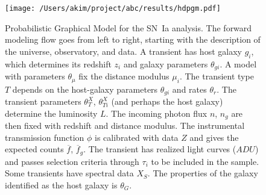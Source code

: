 \documentclass[preprint,3p]{elsarticle}
\begin{document}
\begin{figure}[htbp] %
   \centering
   \texttt{[image: /Users/akim/project/abc/results/hdpgm.pdf]} 
   \caption{Probabilistic Graphical Model for the SN~Ia analysis.  
   The forward modeling
   flow goes from left to right, starting with the description of the universe, observatory,
   and data.    A transient has host galaxy $g_i$, which determines its redshift $z_i$
   and galaxy parameters $\theta_{gi}$.
   A model with parameters $\theta_\mu$ fix the distance modulus $\mu_i$.
   The transient type $T$ depends on the host-galaxy parameters  $\theta_{gi}$
   and rates $\theta_r$.   The transient
   parameters $\theta_T^X$, $\theta_{Ti}^X$ (and perhaps the host galaxy) determine the luminosity $L$.       The 
   incoming photon flux $n$, $n_g$  are then fixed
   with redshift and distance modulus.
   The instrumental transmission function $\phi$ is calibrated with data ${Z}$ and
   gives the expected
   counts $\overline{f}$, $\overline{f}_g$. 
   The transient has realized light curves (${ADU}$) and passes selection criteria
   through $\tau_i$ to be included in the sample.  Some transients have spectral data
   ${X}_S$.  The properties of the galaxy identified as the host galaxy is $\theta_G$. 
   \label{pgm:fig}}
\end{figure}
\end{document}
